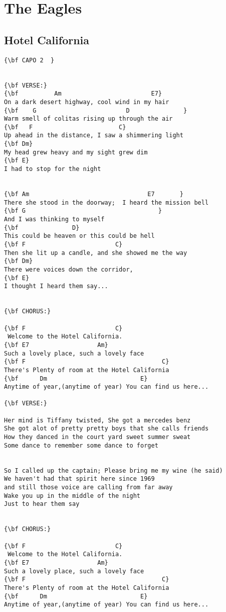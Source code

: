\documentclass[a4paper]{article}
\begin{document}
\section{The Eagles} %
\label{sec:The Eagles}
\subsection{Hotel California} %
\label{sub:Hotel Californi}
\begin{Verbatim}[commandchars=\\\{\}]
{\bf CAPO 2  }


{\bf VERSE:}
{\bf          Am                         E7}
On a dark desert highway, cool wind in my hair
{\bf    G                         D               }
Warm smell of colitas rising up through the air
{\bf   F                        C}
Up ahead in the distance, I saw a shimmering light
{\bf Dm}
My head grew heavy and my sight grew dim
{\bf E}
I had to stop for the night


{\bf Am                                 E7       }
There she stood in the doorway;  I heard the mission bell
{\bf G                                     }
And I was thinking to myself 
{\bf               D}
This could be heaven or this could be hell
{\bf F                         C}
Then she lit up a candle, and she showed me the way
{\bf Dm}
There were voices down the corridor, 
{\bf E}
I thought I heard them say...


{\bf CHORUS:}

{\bf F                         C}
 Welcome to the Hotel California.
{\bf E7                   Am}
Such a lovely place, such a lovely face
{\bf F                                      C}
There's Plenty of room at the Hotel California
{\bf      Dm                          E}
Anytime of year,(anytime of year) You can find us here...

{\bf VERSE:}

Her mind is Tiffany twisted, She got a mercedes benz
She got alot of pretty pretty boys that she calls friends
How they danced in the court yard sweet summer sweat
Some dance to remember some dance to forget


So I called up the captain; Please bring me my wine (he said)
We haven't had that spirit here since 1969
and still those voice are calling from far away
Wake you up in the middle of the night 
Just to hear them say


{\bf CHORUS:}

{\bf F                         C}
 Welcome to the Hotel California.
{\bf E7                   Am}
Such a lovely place, such a lovely face
{\bf F                                      C}
There's Plenty of room at the Hotel California
{\bf      Dm                          E}
Anytime of year,(anytime of year) You can find us here...


\end{Verbatim}
\end{document}
